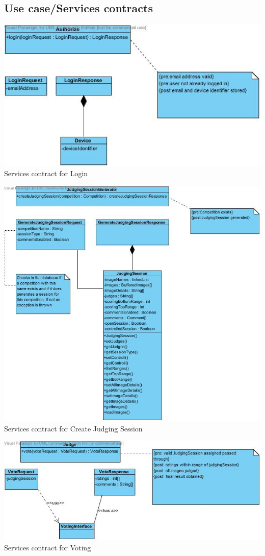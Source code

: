 \documentclass[10pt,a4paper]{article}
\begin{document}
\subsection{Use case/Services contracts}
\begin{center}
\advance\leftskip-1.3cm
\includegraphics[width=160mm]{Pictures/servicesContractLogin.jpg} 
Services contract for Login
\end{center}

\begin{center}
\advance\leftskip-1.3cm
\includegraphics[width=160mm]{Pictures/servicesContractCreateJudgingSession.jpg} 
Services contract for Create Judging Session
\end{center}

\begin{center}
\advance\leftskip-1.3cm
\includegraphics[width=160mm]{Pictures/servicesContractVote.jpg} 
Services contract for Voting
\end{center}
\end{document}
